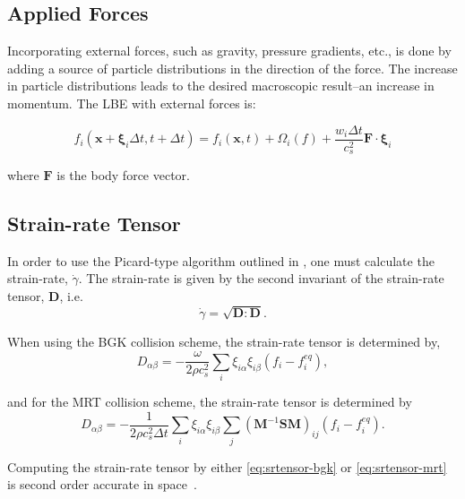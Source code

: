 \documentclass[pdftex,ms]{pittetd}
\newcommand{\pos}{\mathbf{x}}
\newcommand{\pvel}{\boldsymbol{\xi}}
\newcommand{\transM}{\mathbf{M}}
\newcommand{\relaxM}{\mathbf{S}}
\begin{document}
\subsection{Applied Forces}

Incorporating external forces, such as gravity, pressure gradients, etc., is done by adding a source of particle distributions in the direction of the force.
The increase in particle distributions leads to the desired macroscopic result--an increase in momentum.
The LBE with external forces is:

\begin{equation}
f_i(\pos + \pvel_i \Delta t, t + \Delta t) = f_i(\pos, t) + \Omega_i(f) + \frac{w_i \Delta t}{c_s^2} \mathbf{F} \cdot \pvel_i
\end{equation}

\noindent where $\mathbf{F}$ is the body force vector.

\newcommand{\srtensor}{\mathbf{D}}

\subsection{Strain-rate Tensor}

In order to use the Picard-type algorithm outlined in , one must calculate the strain-rate, $\dot{\gamma}$.
The strain-rate is given by the second invariant of the strain-rate tensor, $\srtensor$, i.e.
\begin{equation} \label{eq:second-invariant}
\dot{\gamma} = \sqrt{\srtensor : \srtensor}.
\end{equation}

\noindent When using the BGK collision scheme, the strain-rate tensor is determined by,
\begin{equation} \label{eq:srtensor-bgk}
D_{\alpha \beta} = -\frac{\omega}{2 \rho c_s^2} \sum_i \xi_{i \alpha} \xi_{i \beta} (f_i - f^{eq}_i),
\end{equation} %

\noindent and for the MRT collision scheme, the strain-rate tensor is determined by
\begin{equation} \label{eq:srtensor-mrt}
D_{\alpha \beta} = -\frac{1}{2 \rho c_s^2 \Delta t} \sum_i \xi_{i \alpha} \xi_{i \beta} \sum_j (\transM^{-1} \relaxM \transM)_{ij}(f_i - f^{eq}_i).
\end{equation} %

\noindent Computing the strain-rate tensor by either \eqref{eq:srtensor-bgk} or \eqref{eq:srtensor-mrt} is second order accurate in space~\cite{kruger2009shear,kruger2010second}.
\end{document}
